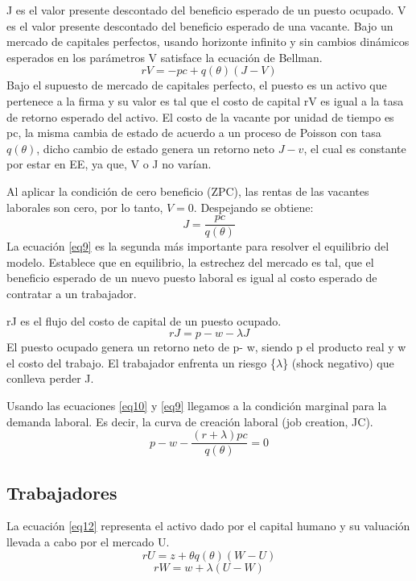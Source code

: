 \documentclass[12pt,oneside]{reedthesis}
\begin{document}
J es el valor presente descontado del beneficio esperado de un puesto ocupado. V es el valor presente descontado del beneficio esperado de una vacante. Bajo un mercado de capitales perfectos, usando horizonte infinito y sin cambios dinámicos esperados en los parámetros V satisface la ecuación de Bellman.
\begin{equation} \label{eq8}
rV = - pc + q(\theta)(J-V)
\end{equation}
Bajo el supuesto de mercado de capitales perfecto, el puesto es un activo que pertenece a la firma y su valor es tal que el costo de capital rV es igual a la tasa de retorno esperado del activo. El costo de la vacante por unidad de tiempo es pc, la misma cambia de estado de acuerdo a un proceso de Poisson con tasa \(q(\theta)\), dicho cambio de estado genera un retorno neto \(J-v\), el cual es constante por estar en EE, ya que, V o J no varían.

Al aplicar la condición de cero beneficio (ZPC), las rentas de las vacantes laborales son cero, por lo tanto, \(V=0\). Despejando se obtiene:
\begin{equation} \label{eq9}
J = \frac{pc}{q(\theta)}
\end{equation}
La ecuación \eqref{eq9} es la segunda más importante para resolver el equilibrio del modelo. Establece que en equilibrio, la estrechez del mercado es tal, que el beneficio esperado de un nuevo puesto laboral es igual al costo esperado de contratar a un trabajador.

rJ es el flujo del costo de capital de un puesto ocupado.
\begin{equation} \label{eq10}
rJ = p - w - \lambda J
\end{equation}
El puesto ocupado genera un retorno neto de p- w, siendo p el producto real y w el costo del trabajo. El trabajador enfrenta un riesgo \{\(\lambda\)\} (shock negativo) que conlleva perder J.

Usando las ecuaciones \eqref{eq10} y \eqref{eq9} llegamos a la condición marginal para la demanda laboral. Es decir, la curva de creación laboral (job creation, JC).
\begin{equation} \label{eq11}
p - w  - \frac{(r+\lambda)pc}{q(\theta)} = 0
\end{equation}
\subsection{Trabajadores}

La ecuación \eqref{eq12} representa el activo dado por el capital humano y su valuación llevada a cabo por el mercado U.
\begin{equation} \label{eq12}
rU = z + \theta q(\theta)(W-U)
\end{equation}
\begin{equation} \label{eq13}
rW = w + \lambda(U-W)
\end{equation}
\end{document}
